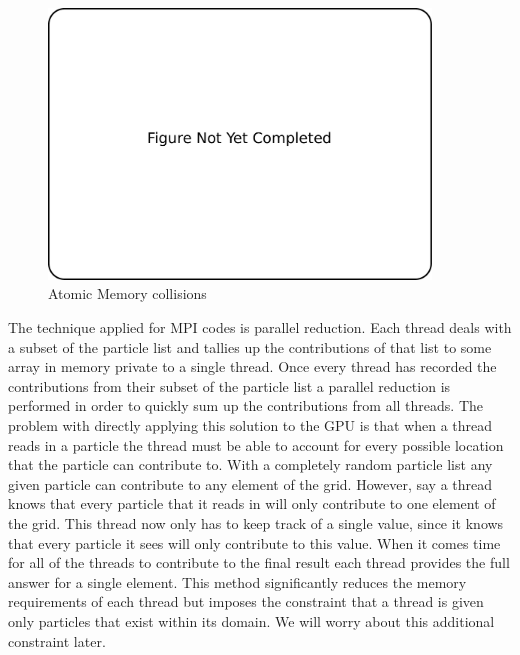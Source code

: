 \begin{figure}
\begin{center}
\includegraphics[width=4in]{introduction/not_finished.pdf}
\end{center}
\caption{Atomic Memory collisions}
\label{fig:pic_flowchart_parallel}
\end{figure}

The technique applied for MPI codes is parallel reduction. Each thread deals with a subset of the particle list and tallies up the contributions of that list to some array in memory private to a single thread. Once every thread has recorded the contributions from their subset of the particle list a parallel reduction is performed in order to quickly sum up the contributions from all threads. The problem with directly applying this solution to the GPU is that when a thread reads in a particle the thread must be able to account for every possible location that the particle can contribute to. With a completely random particle list any given particle can contribute to any element of the grid. However, say a thread knows that every particle that it reads in will only contribute to one element of the grid. This thread now only has to keep track of a single value, since it knows that every particle it sees will only contribute to this value. When it comes time for all of the threads to contribute to the final result each thread provides the full answer for a single element. This method significantly reduces the memory requirements of each thread but imposes the constraint that a thread is given only particles that exist within its domain. We will worry about this additional constraint later. 

